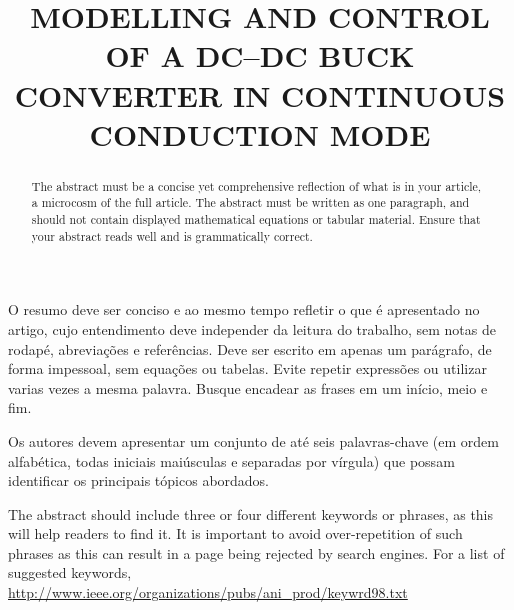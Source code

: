 \title{MODELLING AND CONTROL OF A DC--DC BUCK CONVERTER IN CONTINUOUS CONDUCTION MODE} %

\maketitle




\begin{resumo}  O resumo deve ser conciso e ao mesmo tempo refletir o que é apresentado no artigo, cujo entendimento deve independer da leitura do trabalho, sem notas de rodapé, abreviações e referências. Deve ser escrito em apenas um parágrafo, de forma impessoal, sem equações ou tabelas. Evite repetir expressões ou utilizar varias vezes a mesma palavra. Busque encadear as frases em um início, meio e fim.
\end{resumo}

\begin{palavraschave }
		Os autores devem apresentar um conjunto de até seis palavras-chave (em ordem alfabética, todas iniciais maiúsculas e separadas por vírgula) que possam identificar os principais tópicos abordados.	
\end{palavraschave }

\englishtitle

\begin{abstract}
	The abstract must be a concise yet comprehensive reflection of what is in your article, a microcosm of the full article. The abstract must be written as one paragraph, and should not contain displayed mathematical equations or tabular material.  Ensure that your abstract reads well and is grammatically correct.
\end{abstract}

\begin{keywords}
	The abstract should include three or four different keywords or phrases, as this will help readers to find it. It is important to avoid over-repetition of such phrases as this can result in a page being rejected by search engines. For a list of suggested keywords, \url{http://www.ieee.org/organizations/pubs/ani_prod/keywrd98.txt}
\end{keywords}

